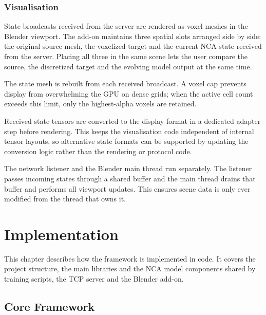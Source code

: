 \subsection{Visualisation}

State broadcasts received from the server are rendered as voxel meshes in the
Blender viewport. The add-on maintains three spatial slots arranged side by
side: the original source mesh, the voxelized target and the current NCA state
received from the server. Placing all three in the same scene lets the user
compare the source, the discretized target and the evolving model output at
the same time.

The state mesh is rebuilt from each received broadcast. A voxel cap prevents
display from overwhelming the GPU on dense grids; when the active cell count
exceeds this limit, only the highest-alpha voxels are retained.

Received state tensors are converted to the display format in a dedicated
adapter step before rendering. This keeps the visualisation code independent of
internal tensor layouts, so alternative state formats can be supported by
updating the conversion logic rather than the rendering or protocol code.

The network listener and the Blender main thread run separately. The listener
passes incoming states through a shared buffer and the main thread drains that
buffer and performs all viewport updates. This ensures scene data is only ever
modified from the thread that owns it.

\chapter{Implementation}

This chapter describes how the framework is implemented in code. It covers the
project structure, the main libraries and the NCA model components shared by
training scripts, the TCP server and the Blender add-on.


\section{Core Framework}

